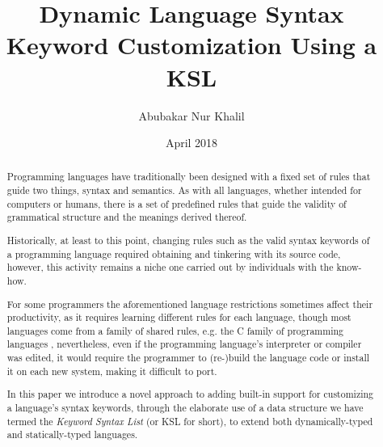 \documentclass{article}
\begin{document}
\title{Dynamic Language Syntax Keyword Customization Using a KSL}
\author{Abubakar Nur Khalil}
\date{April 2018}

\maketitle
\begin{abstract}
  Programming languages have traditionally been designed with a fixed set of rules that guide two things, syntax and semantics.
  As with all languages, whether intended for computers or humans, there is a set of predefined rules that guide the validity of grammatical structure and the meanings derived thereof.
  
  Historically, at least to this point, changing rules such as the valid syntax keywords of a programming language required obtaining and tinkering with its source code, however, this activity remains a niche one carried out by individuals with the know-how.
  
  For some programmers the aforementioned language restrictions sometimes affect their productivity, as it requires learning different rules for each language, though most languages come from a family of shared rules, e.g. the C family of programming languages \cite{Cfam}, nevertheless, even if the programming language's interpreter or compiler was edited, it would require the programmer to (re-)build the language code or install it on each new system, making it difficult to port.
  
  In this paper we introduce a novel approach to adding built-in support for customizing a language's syntax keywords, through the elaborate use of a data structure we have termed the \textit{Keyword Syntax List} (or KSL for short), to extend both dynamically-typed and statically-typed languages.
\end{abstract}

%
%
\end{document}
